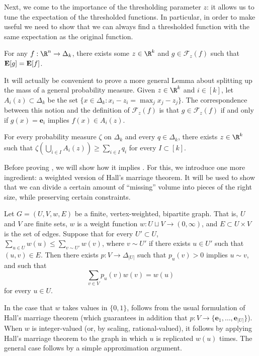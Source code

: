 \documentclass{toc}
\newcommand{\E}{{\bf E}}
\newcommand{\calF}{\mathcal{F}}
\begin{document}
Next, we come to the importance of the thresholding parameter $z$: it allows us to tune the expectation of the thresholded functions. In particular, in order to make  useful we need to show that we can always find a thresholded function with the same expectation as the original function.

\begin{lemma}\label{lem:rounding-existence}
  For any $f: \R^n \to \Delta_k$, there exists some $z\in \R^k$ and $g \in \calF_z(f)$ such that $\E[g] = \E[f]$.
\end{lemma}

It will actually be convenient to prove a more general Lemma about splitting up the mass of a general probability measure.
Given $z \in \R^k$ and $i \in [k]$, let $A_i(z) \subset \Delta_k$ be the set $\{x \in \Delta_k: x_i - z_i = \max_j x_j - z_j\}$. The correspondence between this notion and the definition of $\calF_z(f)$ is that $g \in \calF_z(f)$ if and only if $g(x) = \mathbf{e}_i$ implies $f(x) \in A_i(z)$.

\begin{lemma}\label{lem:rounding-prob-measure}
  For every probability measure $\zeta$ on $\Delta_k$ and every $q \in \Delta_k$,
  there exists $z \in \R^k$ such that $\zeta(\bigcup_{i \in I} A_i(z)) \ge \sum_{i \in I} q_i$ for every $I \subset [k]$.
\end{lemma}

Before proving , we will show how it implies .
For this, we introduce one more ingredient: a weighted version of Hall's marriage theorem.
It will be used to show that we can divide a certain amount of ``missing'' volume into pieces of the right size,
while preserving certain constraints.

\begin{lemma}\label{lem:hall}
  Let $G = (U, V, w, E)$ be a finite, vertex-weighted, bipartite graph. That is, $U$ and $V$ are finite sets, $w$ is a weight function $w: U \sqcup V \to (0, \infty)$, and $E \subset U \times V$ is the
  set of edges. Suppose that for every $U' \subset U$, $\sum_{u \in U} w(u) \le \sum_{v \sim U'} w(v)$, where $v \sim U'$ if there exists $u \in U'$ such that $(u, v) \in E$. Then
  there exists $p: V \to \Delta_{|U|}$ such that $p_u(v) > 0$ implies $u \sim v$, and such that
  \[
    \sum_{v \in V} p_u(v) w(v) = w(u)
  \]
  for every $u \in U$.
\end{lemma}
In the case that $w$ takes values in $\{0, 1\}$,  follows from the usual formulation of Hall's marriage theorem
(which guarantees in addition that $p: V \to \{\mathbf{e}_1, \dots, \mathbf{e}_{|U|}\}$). When
$w$ is integer-valued (or, by scaling, rational-valued), it follows by applying Hall's marriage
theorem to the graph in which $u$ is replicated $w(u)$ times. The general case follows by
a simple approximation argument.
\end{document}
